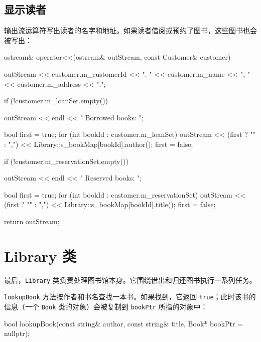 \subsection{显示读者}

输出流运算符写出读者的名字和地址。如果读者借阅或预约了图书，这些图书也会被写出：

\begin{codebox}
ostream& operator<<(ostream& outStream, const Customer& customer){
  outStream << customer.m_customerId << ". " << customer.m_name
            << ", " << customer.m_address << ".";

  if (!customer.m_loanSet.empty()) {
    outStream << endl << "  Borrowed books: ";

    bool first = true;
    for (int bookId : customer.m_loanSet) {
      outStream << (first ? "" : ",")
                << Library::s_bookMap[bookId].author();
      first = false;
    }
 }

  if (!customer.m_reservationSet.empty()) {
    outStream << endl << "  Reserved books: ";

    bool first = true;
    for (int bookId : customer.m_reservationSet) {
      outStream << (first ? "" : ",")
                << Library::s_bookMap[bookId].title();
      first = false;
    }
  }

  return outStream;
}
\end{codebox}

\section{Library 类}

最后，\texttt{Library} 类负责处理图书馆本身。它围绕借出和归还图书执行一系列任务。

\medskip{}

\begin{codebox}
class Library {
  public:
    Library();
  private:
    static string s_binaryPath;
\end{codebox}

\texttt{lookupBook} 方法按作者和书名查找一本书。如果找到，它返回 \texttt{true}；此时该书的信息（一个 \texttt{Book} 类的对象）会被复制到 \texttt{bookPtr} 所指的对象中：

\begin{codebox}
    bool lookupBook(const string& author, const string& title,
                    Book* bookPtr = nullptr);
\end{codebox}

